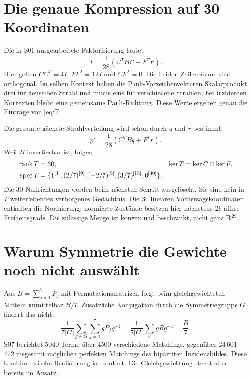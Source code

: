 \section{Die genaue Kompression auf 30 Koordinaten}
Die in S01 ausgearbeitete Faktorisierung lautet
\begin{equation}
\boxed{T=\frac1{28}(C^TBC+F^TF).}
\label{eq:Tfactor}
\end{equation}
Hier gelten $CC^T=4I$, $FF^T=12I$ und $CF^T=0$. Die beiden Zeilenräume sind orthogonal. Im selben Kontext haben die Pauli-Vorzeichenvektoren Skalarprodukt drei für denselben Strahl und minus eins für verschiedene Strahlen; bei inzidenten Kontexten bleibt eine gemeinsame Pauli-Richtung. Diese Werte ergeben genau die Einträge von \eqref{eq:T}.

Die gesamte nächste Strahlverteilung wird schon durch $q$ und $r$ bestimmt:
\begin{equation}
p'=\frac1{28}(C^TBq+F^Tr).
\end{equation}
Weil $B$ invertierbar ist, folgen
\begin{align}
\operatorname{rank} T&=30,&\ker T&=\ker C\cap\ker F,\\
\operatorname{spec} T&=\{1^{[1]},(2/7)^{[9]},(-2/7)^{[5]},(3/7)^{[15]},0^{[30]}\}.
\end{align}
Die 30 Nullrichtungen werden beim nächsten Schritt ausgelöscht. Sie sind kein in $T$ weiterlebendes verborgenes Gedächtnis. Die 30 linearen Vorhersagekoordinaten enthalten die Normierung; normierte Zustände besitzen hier höchstens 29 affine Freiheitsgrade. Die zulässige Menge ist konvex und beschränkt, nicht ganz $\mathbb R^{29}$.

\section{Warum Symmetrie die Gewichte noch nicht auswählt}


Aus $B=\sum_{j=1}^7P_j$ mit Permutationsmatrizen folgt beim gleichgewichteten Mitteln unmittelbar $B/7$. Zusätzliche Konjugation durch die Symmetriegruppe $G$ ändert das nicht:
\begin{equation}
\frac1{7|G|}\sum_{g\in G}\sum_{j=1}^7gP_jg^{-1}
=\frac1{7|G|}\sum_g gBg^{-1}=\frac B7.
\end{equation}
S07 berichtet 5040 Terme über 4500 verschiedene Matchings, gegenüber 24\,601\,472 insgesamt möglichen perfekten Matchings des bipartiten Inzidenzbildes. Diese kombinatorische Realisierung ist konkret. Die Gleichgewichtung steckt aber bereits im Ansatz.

